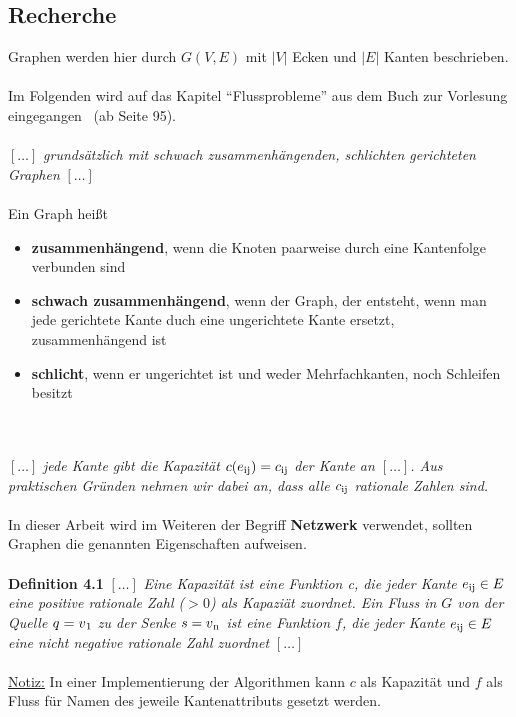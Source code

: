 \documentclass[11pt]{article}
\begin{document}
    \subsection{Recherche}
    Graphen werden hier durch $G(V,E)$ mit $|V|$ Ecken und $|E|$ Kanten beschrieben.\\~\\
    Im Folgenden wird auf das Kapitel "`Flussprobleme"' aus dem Buch zur Vorlesung eingegangen~\cite{grbuch} (ab Seite 95).\\~\\
    $[\ldots]$ \textit{grunds\"atzlich mit schwach zusammenh\"angenden, schlichten gerichteten Graphen} $[\ldots]$\\~\\
    Ein Graph hei\ss{}t
    \begin{itemize}
        \item \textbf{zusammenh\"angend}, wenn die Knoten paarweise durch eine Kantenfolge verbunden sind
        \item \textbf{schwach zusammenh\"angend}, wenn der Graph, der entsteht, wenn man jede gerichtete Kante duch eine ungerichtete Kante ersetzt, zusammenh\"angend ist
        \item \textbf{schlicht}, wenn er ungerichtet ist und weder Mehrfachkanten, noch Schleifen besitzt
    \end{itemize}\\~\\
    $[\ldots]$ \textit{jede Kante gibt die Kapazit\"at $c(e\textsubscript{ij})=c\textsubscript{ij}$ der Kante an $[\ldots]$. Aus praktischen Gr\"unden nehmen wir dabei an, dass alle $c\textsubscript{ij}$ rationale Zahlen sind.}\\~\\
    In dieser Arbeit wird im Weiteren der Begriff \textbf{Netzwerk} verwendet, sollten Graphen die genannten Eigenschaften aufweisen.\\~\\
    \textbf{Definition 4.1} $[\ldots]$ \textit{Eine Kapazit\"at ist eine Funktion c, die jeder Kante $e\textsubscript{ij} \in E$  eine positive rationale Zahl ($> 0$) als Kapazi\"at zuordnet. Ein Fluss in $G$ von der Quelle $q = v\textsubscript{1}$ zu der Senke $s = v\textsubscript{n}$ ist eine Funktion $f$, die jeder Kante $e\textsubscript{ij} \in E$ eine nicht negative rationale Zahl zuordnet} $[\ldots]$\\~\\
    \underline{Notiz:} In einer Implementierung der Algorithmen kann $c$ als Kapazit\"at und $f$ als Fluss f\"ur Namen des jeweile Kantenattributs gesetzt werden.\\~\\
\end{document}
